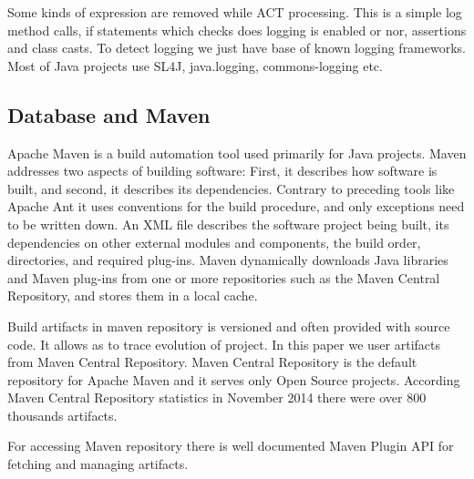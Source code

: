 Some kinds of expression are removed while ACT processing. This is a simple
log method calls, if statements which checks does logging is enabled or nor,
assertions and class casts. To detect logging we just have base of known logging
frameworks. Most of Java projects use SL4J, java.logging, commons-logging etc.

\subsection{Database and Maven}

Apache Maven is a build automation tool used primarily for Java projects. Maven
addresses two aspects of building software: First, it describes how software is built, 
and second, it describes its dependencies. Contrary to preceding tools like Apache
Ant it uses conventions for the build procedure, and only exceptions need to be
written down. An XML file describes the software project being built, its
dependencies on other external modules and components, the build order, 
directories, and required plug-ins. Maven dynamically downloads Java libraries
and Maven plug-ins from one or more repositories such as the Maven  Central 
Repository, and stores them in a local cache.

Build artifacts in maven repository is versioned and often provided with source
code. It allows as to trace evolution of project. In this paper we user
artifacts from Maven Central Repository. Maven Central Repository is
the default repository for Apache Maven and it serves only Open Source projects. 
According Maven Central Repository statistics in November 2014 there were over 800 
thousands artifacts.

For accessing Maven repository there is well documented Maven Plugin API for
fetching and managing artifacts.

